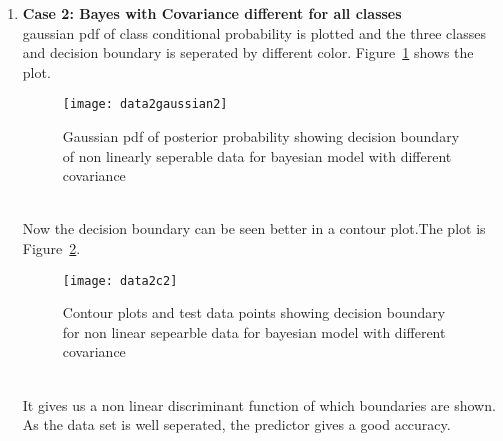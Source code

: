 \documentclass[11pt,paper=a4,answers]{exam}
\begin{document}
\begin{questions}
\begin{enumerate}[i.]
\begin{enumerate}
            \item \textbf{Case 2: Bayes with Covariance different for all classes}\\
            gaussian pdf of class conditional probability is plotted and the three classes and decision boundary is seperated by different color. Figure~\ref{fig:data2g2} shows the plot.\\
            \begin{figure}[ht]
                \centering
                \texttt{[image: data2gaussian2]}
                \vspace{-30pt}
                \caption{Gaussian pdf of posterior probability showing decision boundary of non linearly seperable data for bayesian model with different covariance}
                \label{fig:data2g2}
            \end{figure}\\
            Now the decision boundary can be seen better in a contour plot.The plot is Figure~\ref{fig:data2c2}.\\ 
            \begin{figure}[ht]
                \centering
                \texttt{[image: data2c2]}
                \vspace{-30pt}
                \caption{Contour plots and test data points showing decision boundary for non linear sepearble data for bayesian model with different covariance}
                \label{fig:data2c2}
            \end{figure}\\
            It gives us a non linear discriminant function of which boundaries are shown. As the data set is well seperated, the predictor gives a good accuracy.


\end{enumerate}
\end{enumerate}
\end{questions}
\end{document}
